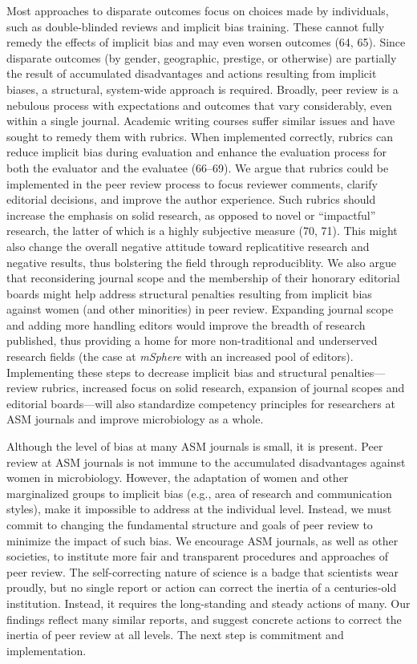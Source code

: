 \documentclass[11pt,]{article}
\begin{document}
Most approaches to disparate outcomes focus on choices made by
individuals, such as double-blinded reviews and implicit bias training.
These cannot fully remedy the effects of implicit bias and may even
worsen outcomes (64, 65). Since disparate outcomes (by gender,
geographic, prestige, or otherwise) are partially the result of
accumulated disadvantages and actions resulting from implicit biases, a
structural, system-wide approach is required. Broadly, peer review is a
nebulous process with expectations and outcomes that vary considerably,
even within a single journal. Academic writing courses suffer similar
issues and have sought to remedy them with rubrics. When implemented
correctly, rubrics can reduce implicit bias during evaluation and
enhance the evaluation process for both the evaluator and the evaluatee
(66--69). We argue that rubrics could be implemented in the peer review
process to focus reviewer comments, clarify editorial decisions, and
improve the author experience. Such rubrics should increase the emphasis
on solid research, as opposed to novel or ``impactful'' research, the
latter of which is a highly subjective measure (70, 71). This might also
change the overall negative attitude toward replicatitive research and
negative results, thus bolstering the field through reproduciblity. We
also argue that reconsidering journal scope and the membership of their
honorary editorial boards might help address structural penalties
resulting from implicit bias against women (and other minorities) in
peer review. Expanding journal scope and adding more handling editors
would improve the breadth of research published, thus providing a home
for more non-traditional and underserved research fields (the case at
\emph{mSphere} with an increased pool of editors). Implementing these
steps to decrease implicit bias and structural penalties---review
rubrics, increased focus on solid research, expansion of journal scopes
and editorial boards---will also standardize competency principles for
researchers at ASM journals and improve microbiology as a whole.

Although the level of bias at many ASM journals is small, it is present.
Peer review at ASM journals is not immune to the accumulated
disadvantages against women in microbiology. However, the adaptation of
women and other marginalized groups to implicit bias (e.g., area of
research and communication styles), make it impossible to address at the
individual level. Instead, we must commit to changing the fundamental
structure and goals of peer review to minimize the impact of such bias.
We encourage ASM journals, as well as other societies, to institute more
fair and transparent procedures and approaches of peer review. The
self-correcting nature of science is a badge that scientists wear
proudly, but no single report or action can correct the inertia of a
centuries-old institution. Instead, it requires the long-standing and
steady actions of many. Our findings reflect many similar reports, and
suggest concrete actions to correct the inertia of peer review at all
levels. The next step is commitment and implementation.
\end{document}
